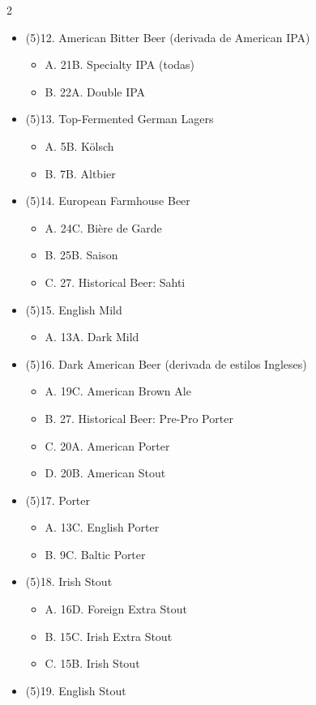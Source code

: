 \begin{multicols*}{2}
\begin{itemize}[noitemsep]
\item[] (5)12. American Bitter Beer (derivada de American IPA)
\begin{itemize}
  \item[] A. 21B. Specialty IPA (todas)
  \item[] B. 22A. Double IPA
\end{itemize}
\item[] (5)13. Top-Fermented German Lagers
\begin{itemize}
  \item[] A. 5B. Kölsch
  \item[] B. 7B. Altbier
\end{itemize}
\item[] (5)14. European Farmhouse Beer
\begin{itemize}
  \item[] A. 24C. Bière de Garde
  \item[] B. 25B. Saison
  \item[] C. 27. Historical Beer: Sahti
\end{itemize}
\item[] (5)15. English Mild
\begin{itemize}
  \item[] A. 13A. Dark Mild
\end{itemize}
\item[] (5)16. Dark American Beer (derivada de estilos Ingleses)
\begin{itemize}
  \item[] A. 19C. American Brown Ale
  \item[] B. 27. Historical Beer: Pre-Pro Porter
  \item[] C. 20A. American Porter
  \item[] D. 20B. American Stout
\end{itemize}
\item[] (5)17. Porter
\begin{itemize}
  \item[] A. 13C. English Porter
  \item[] B. 9C. Baltic Porter
\end{itemize}
\item[] (5)18. Irish Stout
\begin{itemize}
  \item[] A. 16D. Foreign Extra Stout
  \item[] B. 15C. Irish Extra Stout
  \item[] C. 15B. Irish Stout
\end{itemize}
\item[] (5)19. English Stout

\end{itemize}
\end{multicols*}
